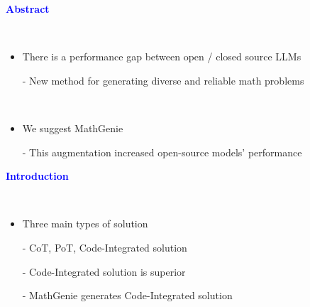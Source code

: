 \documentclass[professionalfont]{beamer}
\begin{document}
\frame{\titlepage}

\begin{frame}
\begin{center}
    { \textbf{\textcolor{blue}{ {\fontsize{12}{14}\selectfont Abstract} }} }
\end{center}
\\[0.5cm]

{\fontsize{10}{14}\selectfont 
\begin{itemize}
    \item There is a performance gap between open / closed source LLMs
    
    - New method for generating diverse and reliable math problems
\end{itemize}
\\[0.5cm]

\begin{itemize}
    \item We suggest MathGenie
    
    - This augmentation increased open-source models' performance
\end{itemize}
}

\end{frame}

\begin{frame}
\begin{center}
    { \textbf{\textcolor{blue}{ {\fontsize{12}{14}\selectfont Introduction} }} }
\end{center}
\\[0.5cm]

{\fontsize{10}{14}\selectfont 
\begin{itemize}
    \item Three main types of solution
    
    - CoT, PoT, Code-Integrated solution
    
    - Code-Integrated solution is superior

    - MathGenie generates Code-Integrated solution
\end{itemize}
}

\end{frame}
\end{document}
